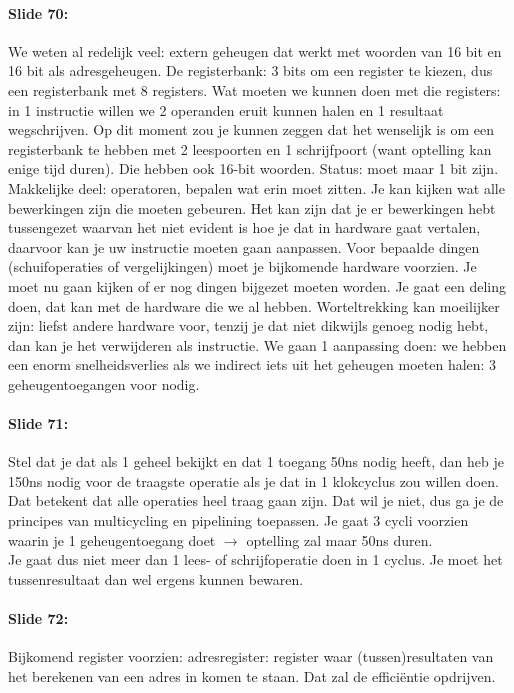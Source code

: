 \documentclass[10pt,a4paper]{book}
\begin{document}
\paragraph{Slide 70:} We weten al redelijk veel: extern geheugen dat werkt met woorden van 16 bit en 16 bit als adresgeheugen. De registerbank: 3 bits om een register te kiezen, dus een registerbank met 8 registers. Wat moeten we kunnen doen met die registers: in 1 instructie willen we 2 operanden eruit kunnen halen en 1 resultaat wegschrijven. Op dit moment zou je kunnen zeggen dat het wenselijk is om een registerbank te hebben met 2 leespoorten en 1 schrijfpoort (want optelling kan enige tijd duren).  Die hebben ook 16-bit woorden. Status: moet maar 1 bit zijn.\\
Makkelijke deel: operatoren, bepalen wat erin moet zitten. Je kan kijken wat alle bewerkingen zijn die moeten gebeuren. Het kan zijn dat je er bewerkingen hebt tussengezet waarvan het niet evident is hoe je dat in hardware gaat vertalen, daarvoor kan je uw instructie moeten gaan aanpassen. Voor bepaalde dingen (schuifoperaties of vergelijkingen) moet je bijkomende hardware voorzien. Je moet nu gaan kijken of er nog dingen bijgezet moeten worden. Je gaat een deling doen, dat kan met de hardware die we al hebben. Worteltrekking kan moeilijker zijn: liefst andere hardware voor, tenzij je dat niet dikwijls genoeg nodig hebt, dan kan je het verwijderen als instructie. We gaan 1 aanpassing doen: we hebben een enorm snelheidsverlies als we indirect iets uit het geheugen moeten halen: 3 geheugentoegangen voor nodig.

\paragraph{Slide 71:} Stel dat je dat als 1 geheel bekijkt en dat 1 toegang 50ns nodig heeft, dan heb je 150ns nodig voor de traagste operatie als je dat in 1 klokcyclus zou willen doen. Dat betekent dat alle operaties heel traag gaan zijn. Dat wil je niet, dus ga je de principes van multicycling en pipelining toepassen. Je gaat 3 cycli voorzien waarin je 1 geheugentoegang doet $\rightarrow$ optelling zal maar 50ns duren.\\
Je gaat dus niet meer dan 1 lees- of schrijfoperatie doen in 1 cyclus. Je moet het tussenresultaat dan wel ergens kunnen bewaren.

\paragraph{Slide 72:} Bijkomend register voorzien: adresregister: register waar (tussen)resultaten van het berekenen van een adres in komen te staan. Dat zal de effici\"entie opdrijven. 
\end{document}
